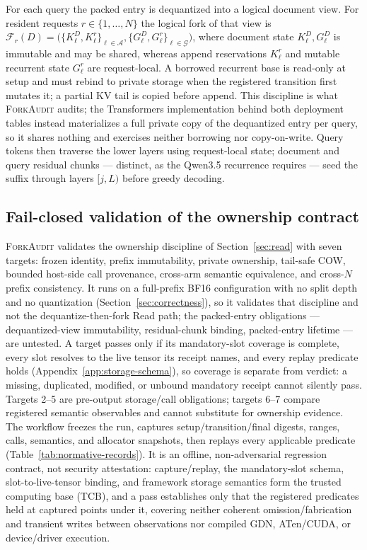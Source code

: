 \documentclass{article}
\newcommand{\method}{\textsc{ForkAudit}}
\begin{document}
For each query the packed entry is dequantized into a logical document view.
For resident requests \(r\in\{1,\ldots,N\}\) the logical fork of that view is
\(\mathcal{F}_r(D)=\bigl(\{K^D_\ell,K^r_\ell\}_{\ell\in\mathcal A},
\{G^D_\ell,G^r_\ell\}_{\ell\in\mathcal G}\bigr)\),
where document state \(K^D_\ell,G^D_\ell\) is immutable and may be shared,
whereas append reservations \(K^r_\ell\) and mutable recurrent state
\(G^r_\ell\) are request-local.  A borrowed recurrent base is read-only at setup
and must rebind to private storage when the registered transition first mutates
it; a partial KV tail is copied before append.  This discipline is what
\method{} audits; the Transformers implementation behind both deployment tables
instead materializes a full private copy of the dequantized entry per query, so
it shares nothing and exercises neither borrowing nor copy-on-write.  Query
tokens then traverse the lower layers using request-local state; document and
query residual chunks --- distinct, as the Qwen3.5 recurrence requires --- seed
the suffix through layers $[j,L)$ before greedy decoding.

\subsection{Fail-closed validation of the ownership contract}
\label{sec:contract}

\method{} validates the ownership discipline of Section~\ref{sec:read} with
seven targets: frozen identity, prefix immutability, private ownership,
tail-safe COW, bounded host-side call provenance, cross-arm semantic
equivalence, and cross-\(N\) prefix consistency. It runs on a full-prefix BF16
configuration with no split depth and no quantization
(Section~\ref{sec:correctness}), so it validates that discipline and not the
dequantize-then-fork Read path; the packed-entry obligations --- dequantized-view
immutability, residual-chunk binding, packed-entry lifetime --- are untested.
A target passes only if its mandatory-slot coverage is complete, every slot
resolves to the live tensor its receipt names, and every replay predicate holds
(Appendix~\ref{app:storage-schema}), so coverage is separate from verdict: a
missing, duplicated, modified, or unbound mandatory receipt cannot silently
pass.  Targets 2--5 are pre-output storage/call obligations; targets 6--7
compare registered semantic observables and cannot substitute for ownership
evidence.  The workflow freezes the run, captures setup/transition/final
digests, ranges, calls, semantics, and allocator snapshots, then replays every
applicable predicate (Table~\ref{tab:normative-records}).  It is an offline,
non-adversarial regression contract, not security attestation: capture/replay,
the mandatory-slot schema, slot-to-live-tensor binding, and framework storage
semantics form the trusted computing base (TCB), and a pass establishes only
that the registered predicates held at captured points under it, covering
neither coherent omission/fabrication and transient writes between observations
nor compiled GDN, ATen/CUDA, or device/driver execution.
\end{document}
